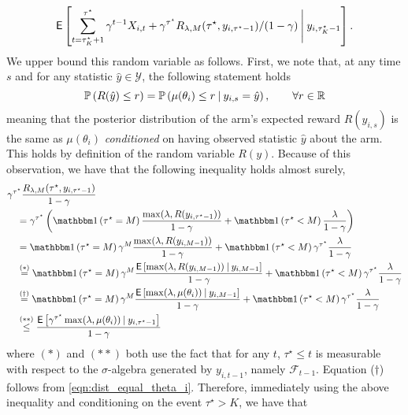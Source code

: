 \begin{myproof}[Proof.]
	\[
		\E\left[\sum_{t=\tau_K^\star+1}^{\tau^\star}  \gamma^{t-1} X_{i,t} + \gamma^{\tau^\star} R_{\lambda,M}(\tau^\star, y_{i,\tau^\star-1})/(1-\gamma)
	\given[\Bigg] y_{i,\tau_K^\star-1} \right].
	\]
	We upper bound this random variable as follows. First, we note that, at any time $s$ and for any statistic $\hat y \in \mathcal{Y}$, the following statement holds
	\begin{equation}\label{eqn:dist_equal_theta_i}
	\P{R(\hat y) \le r} = \P{\mu(\theta_i) \le r \given y_{i,s} = \hat y}, \qquad \forall r \in \Re
	\end{equation}
	meaning that the posterior distribution of the arm's expected reward $R(y_{i,s})$ is the same as $\mu(\theta_i)$ \emph{conditioned} on having observed statistic $\hat y$ about the arm. This holds by definition of the random variable $R(y)$. Because of this observation, we have that the following inequality  holds almost surely,
	{\color{blue}
	\begin{align*}
		& \gamma^{\tau^\star} \frac{R_{\lambda,M}(\tau^\star, y_{i,\tau^\star-1})}{1-\gamma}
		 \nonumber \\
		&\quad =  \gamma^{\tau^\star}\left( \ind{\tau^\star =M}\frac{\max(\lambda, R(y_{i,\tau^\star-1}))}{1-\gamma} + \ind{\tau^\star < M}\frac{\lambda}{1-\gamma}\right)
		 \nonumber\\
		&\quad= \ind{\tau^\star =M} \gamma^{M}\frac{\max(\lambda, R(y_{i,M-1}))}{1-\gamma} + \ind{\tau^\star < M} \gamma^{\tau^\star}\frac{\lambda}{1-\gamma}
	\nonumber\\
		& \quad\overset{(*)}{=} \ind{\tau^\star =M} \gamma^{M}\frac{\Ee{\max(\lambda, R(y_{i,M-1})) \given y_{i,M-1} }}{1-\gamma} + \ind{\tau^\star < M} \gamma^{\tau^\star}\frac{\lambda}{1-\gamma}
		\\
		& \quad\overset{(\dagger)}{=} \ind{\tau^\star =M} \gamma^{M}\frac{\Ee{\max(\lambda, \mu(\theta_i)) \given y_{i,M-1} }}{1-\gamma} + \ind{\tau^\star < M} \gamma^{\tau^\star}\frac{\lambda}{1-\gamma}
		 \\
		&\quad \overset{(**)}{\le} \frac{  \Ee{\gamma^{\tau^\star}\max(\lambda, \mu(\theta_i)) \given y_{i,\tau^\star-1} }}{1-\gamma}
	\end{align*}
	}
	where $(*)$ and $(**)$ both use the fact that for any $t$, $\tau^\star \le t$ is measurable with respect to the $\sigma$-algebra generated by $y_{i,t-1}$, namely $\mathcal F_{t-1}$. Equation ($\dagger$) follows from \eqref{eqn:dist_equal_theta_i}. Therefore, immediately using the above inequality and conditioning on the event $\tau^\star > K$, we have that

\end{myproof}
